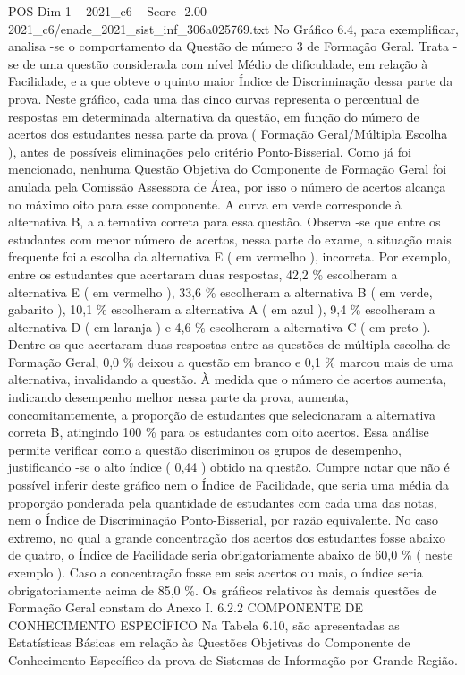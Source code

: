 \begin{textsample}{POS Dim 1 – 2021\_c6 – Score -2.00 – 2021\_c6/enade\_2021\_sist\_inf\_306a025769.txt}
No Gráfico 6.4, para exemplificar, analisa -se o comportamento da Questão de número 3 de Formação Geral.
Trata -se de uma questão considerada com nível Médio de dificuldade, em relação à Facilidade, e a que obteve o quinto maior Índice de Discriminação dessa parte da prova.
Neste gráfico, cada uma das cinco curvas representa o percentual de respostas em determinada alternativa da questão, em função do número de acertos dos estudantes nessa parte da prova ( Formação Geral/Múltipla Escolha ), antes de possíveis eliminações pelo critério Ponto-Bisserial.
Como já foi mencionado, nenhuma Questão Objetiva do Componente de Formação Geral foi anulada pela Comissão Assessora de Área, por isso o número de acertos alcança no máximo oito para esse componente.
A curva em verde corresponde à alternativa B, a alternativa correta para essa questão.
Observa -se que entre os estudantes com menor número de acertos, nessa parte do exame, a situação mais frequente foi a escolha da alternativa E ( em vermelho ), incorreta.
Por exemplo, entre os estudantes que acertaram duas respostas, 42,2 \% escolheram a alternativa E ( em vermelho ), 33,6 \% escolheram a alternativa B ( em verde, gabarito ), 10,1 \% escolheram a alternativa A ( em azul ), 9,4 \% escolheram a alternativa D ( em laranja ) e 4,6 \% escolheram a alternativa C ( em preto ).
Dentre os que acertaram duas respostas entre as questões de múltipla escolha de Formação Geral, 0,0 \% deixou a questão em branco e 0,1 \% marcou mais de uma alternativa, invalidando a questão.
À medida que o número de acertos aumenta, indicando desempenho melhor nessa parte da prova, aumenta, concomitantemente, a proporção de estudantes que selecionaram a alternativa correta B, atingindo 100 \% para os estudantes com oito acertos.
Essa análise permite verificar como a questão discriminou os grupos de desempenho, justificando -se o alto índice ( 0,44 ) obtido na questão.
Cumpre notar que não é possível inferir deste gráfico nem o Índice de Facilidade, que seria uma média da proporção ponderada pela quantidade de estudantes com cada uma das notas, nem o Índice de Discriminação Ponto-Bisserial, por razão equivalente.
No caso extremo, no qual a grande concentração dos acertos dos estudantes fosse abaixo de quatro, o Índice de Facilidade seria obrigatoriamente abaixo de 60,0 \% ( neste exemplo ).
Caso a concentração fosse em seis acertos ou mais, o índice seria obrigatoriamente acima de 85,0 \%.
Os gráficos relativos às demais questões de Formação Geral constam do Anexo I. 6.2.2 COMPONENTE DE CONHECIMENTO ESPECÍFICO Na Tabela 6.10, são apresentadas as Estatísticas Básicas em relação às Questões Objetivas do Componente de Conhecimento Específico da prova de Sistemas de Informação por Grande Região.

\end{textsample}
